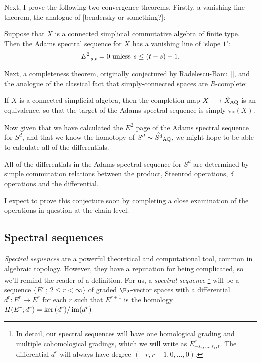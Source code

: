 \documentclass[11pt]{article}
\begin{document}
Next, I prove the following two convergence theorems. Firstly, a vanishing line theorem, the analogue of [bendersky or something?]:
\begin{thm*}\label{vanishing-line-theorem}
Suppose that $X$ is a connected simplicial commutative algebra of finite type. Then the Adams spectral sequence for $X$ has a vanishing line of `slope $1$':
\[E^2_{-s,t}=0\textup{\ unless $s\leq (t-s)+1$}.\]
\end{thm*}
Next, a completeness theorem, originally conjectured by Radelescu-Banu [], and the analogue of the classical fact that simply-connected spaces are $R$-complete:
\begin{thm*}
If $X$ is a connected simplicial algebra, then the completion map $X\to \hat X_\textup{AQ}$ is an equivalence, so that the target of the Adams spectral sequence is simply $\pi_*(X)$.
\end{thm*}

Now given that we have calculated the $E^2$ page of the Adams spectral sequence for $S^d$, and that we know the homotopy of $S^d\sim \hat{S^d}_\textup{AQ}$, we might hope to be able to calculate all of the differentials.
\begin{conjecture}
All of the differentials in the Adams spectral sequence for $S^d$ are determined by simple commutation relations between the product, Steenrod operations, $\delta$ operations and the differential.
\end{conjecture}
\noindent I expect to prove this conjecture soon by completing a close examination of the operations in question at the chain level.
\subsection*{Spectral sequences}
\emph{Spectral sequences} are a powerful theoretical and computational tool, common in algebraic topology. However, they have a reputation for being complicated, so we'll remind the reader of a definition. For us, a \emph{spectral sequence}%
\footnote{In detail, our spectral sequences will have one homological grading and multiple cohomological gradings, which we will write as $E^r_{-s_n,\ldots,s_1,t}$. The differential $d^r$ will always have degree $(-r,r-1,0,\ldots,0)$.} will be a sequence $\{E^r\,;\,2\leq r<\infty\}$ of graded $\F_2$-vector spaces with a differential $d^r:E^r\to E^r$ for each $r$ such that $E^{r+1}$ is the homology $H(E^r;d^r)=\ker(d^r)/\im(d^r)$.
\end{document}
